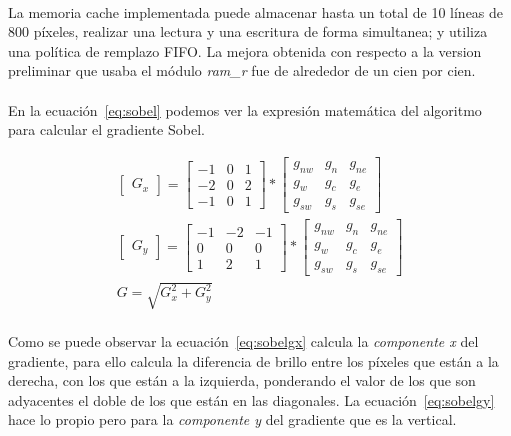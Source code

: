 \documentclass[a4paper,12pt,titlepage,final]{book}
\begin{document}
\paragraph{}
La memoria cache implementada puede almacenar hasta un total de 10 líneas de 800 píxeles, realizar una lectura y una escritura de forma simultanea; y utiliza una política de remplazo FIFO. La mejora obtenida con respecto a la version preliminar que usaba el módulo \textit{ram\_r} fue de alrededor de un cien por cien.

\paragraph{}
En la ecuación~\ref{eq:sobel} podemos ver la expresión matemática del algoritmo para calcular el gradiente Sobel.

\begin{subequations}\label{eq:sobel}
\begin{align}
\begin{bmatrix}
G_x
\end{bmatrix}=
\begin{bmatrix}
-1 & 0 & 1\\
-2 & 0 & 2\\
-1 & 0 & 1
\end{bmatrix}*
\begin{bmatrix}
g_{nw} & g_n & g_{ne}\\
g_w & g_c & g_e\\
g_{sw} & g_s & g_{se}
\end{bmatrix}\label{eq:sobelgx}\\
\begin{bmatrix}
G_y
\end{bmatrix}=
\begin{bmatrix}
-1 & -2 & -1\\
0 & 0 & 0\\
1 & 2 & 1
\end{bmatrix}*
\begin{bmatrix}
g_{nw} & g_n & g_{ne}\\
g_w & g_c & g_e\\
g_{sw} & g_s & g_{se}
\end{bmatrix}\label{eq:sobelgy}\\
G=\sqrt{G_x^2 + G_y^2}\label{eq:sobelg}
\end{align}
\end{subequations}

\paragraph{}
Como se puede observar la ecuación~\ref{eq:sobelgx} calcula la \textit{componente x} del gradiente, para ello calcula la diferencia de brillo entre los píxeles que están a la derecha, con los que están a la izquierda, ponderando el valor de los que son adyacentes el doble de los que están en las diagonales. La ecuación~\ref{eq:sobelgy} hace lo propio pero para la \textit{componente y} del gradiente que es la vertical.
\end{document}
